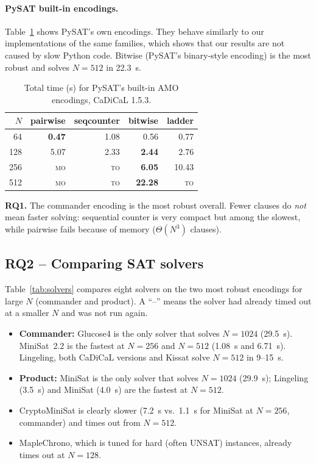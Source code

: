 \documentclass[a4paper,fleqn]{cas-sc}
\newcommand{\TO}{\textsc{to}}
\newcommand{\MO}{\textsc{mo}}
\begin{document}
\paragraph{PySAT built-in encodings.}
Table~\ref{tab:pysat} shows PySAT's own encodings. They behave similarly to our implementations of the same families, which shows that our results are not caused by slow Python code. Bitwise (PySAT's binary-style encoding) is the most robust and solves $N=512$ in 22.3~s.

\begin{table}[pos=htbp]
\caption{Total time (s) for PySAT's built-in AMO encodings, CaDiCaL 1.5.3.}\label{tab:pysat}
\centering
\begin{tabular}{rrrrr}
\toprule
$N$ & pairwise & seqcounter & bitwise & ladder \\
\midrule
64  & \textbf{0.47} & 1.08 & 0.56 & 0.77 \\
128 & 5.07 & 2.33 & \textbf{2.44} & 2.76 \\
256 & \MO & \TO & \textbf{6.05} & 10.43 \\
512 & \MO & \TO & \textbf{22.28} & \TO \\
\bottomrule
\end{tabular}
\end{table}

\begin{finding}
\textbf{RQ1.} The commander encoding is the most robust overall. Fewer clauses do \emph{not} mean faster solving: sequential counter is very compact but among the slowest, while pairwise fails because of memory ($\Theta(N^3)$ clauses).
\end{finding}

\subsection{RQ2 -- Comparing SAT solvers}
Table~\ref{tab:solvers} compares eight solvers on the two most robust encodings for large $N$ (commander and product). A ``--'' means the solver had already timed out at a smaller $N$ and was not run again.
\begin{itemize}
  \item \textbf{Commander:} Glucose4 is the only solver that solves $N=1024$ (29.5~s). MiniSat~2.2 is the fastest at $N=256$ and $N=512$ (1.08~s and 6.71~s). Lingeling, both CaDiCaL versions and Kissat solve $N=512$ in 9--15~s.
  \item \textbf{Product:} MiniSat is the only solver that solves $N=1024$ (29.9~s); Lingeling (3.5~s) and MiniSat (4.0~s) are the fastest at $N=512$.
  \item CryptoMiniSat is clearly slower (7.2~s vs.\ 1.1~s for MiniSat at $N=256$, commander) and times out from $N=512$.
  \item MapleChrono, which is tuned for hard (often UNSAT) instances, already times out at $N=128$.
\end{itemize}
\end{document}
